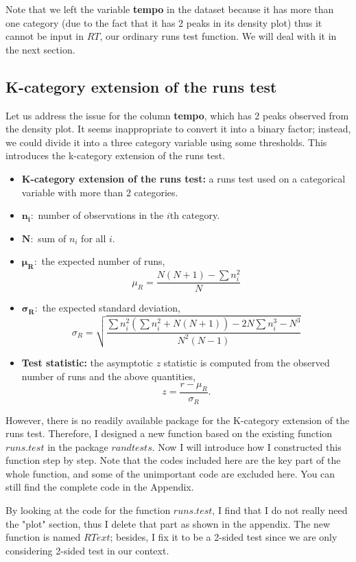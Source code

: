 \documentclass[12pt]{article}
\theoremstyle{plain}
\theoremstyle{definition}
\theoremstyle{remark}
\begin{document}
Note that we left the variable \textbf{tempo} in the dataset because it has more than one category (due to the fact that it has 2 peaks in its density plot) thus it cannot be input in $RT$, our ordinary runs test function. We will deal with it in the next section.


\newpage
\subsection{K-category extension of the runs test}
Let us address the issue for the column \textbf{tempo}, which has 2 peaks observed from the density plot. It seems inappropriate to convert it into a binary factor; instead, we could divide it into a three category variable using some thresholds. This introduces the k-category extension of the runs test\cite{3.4}\cite{3.3}.

\begin{itemize}
    \item \textbf{K-category extension of the runs test:} a runs test used on a categorical variable with more than 2 categories.
    \item $\mathbf{n_i}:$ number of observations in the $i$th category.
    \item $\mathbf N:$ sum of $n_i$ for all $i$.
    \item $\mathbf{\mu_R}:$ the expected number of runs,
    $$\mu_R=\frac{N(N+1)-\sum n_i^2}{N}$$
    \item $\mathbf{\sigma_R}:$ the expected standard deviation,
    \[\sigma_R=\sqrt{\frac{\sum n_i^2(\sum n_i^2+N(N+1))-2N\sum n_i^3-N^3}{N^2(N-1)}}\]
    \item \textbf{Test statistic:} the asymptotic $z$ statistic is computed from the observed number of runs and the above quantities, $$z=\frac{r-\mu_R}{\sigma_R}.$$
\end{itemize}

However, there is no readily available package for the K-category extension of the runs test. Therefore, I designed a new function based on the existing function $runs.test$ in the package $randtests$. Now I will introduce how I constructed this function step by step. Note that the codes included here are the key part of the whole function, and some of the unimportant code are excluded here. You can still find the complete code in the Appendix.

By looking at the code for the function $runs.test$, I find that I do not really need the "plot" section, thus I delete that part as shown in the appendix. The new function is named $RText$; besides, I fix it to be a 2-sided test since we are only considering 2-sided test in our context.
 
\end{document}
